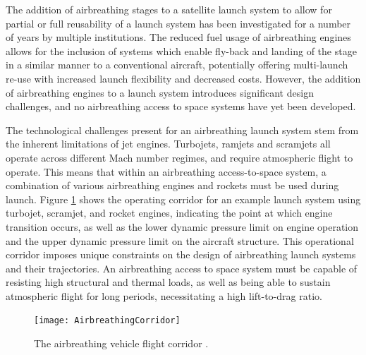   
  
  
    The addition of airbreathing stages to a satellite launch system to allow for partial or full reusability of a launch system has been investigated for a number of years by multiple institutions\cite{Powell1991,Wilhite1991,Varvill2008,Tsuchiya2005,Mehta2001,Preller2017,Trefny1999,Roche2000,Young2006,Bradford2000,Gong2014}. The reduced fuel usage of airbreathing engines allows for the inclusion of systems which enable fly-back and landing of the stage in a similar manner to a conventional aircraft, potentially offering multi-launch re-use with increased launch flexibility and decreased costs\cite{Preller2017}. However, the addition of airbreathing engines to a launch system introduces significant design challenges, and 
    no airbreathing access to space systems have yet been developed. 
    
    The technological challenges present for an airbreathing launch system stem from the inherent limitations of jet engines. Turbojets, ramjets and scramjets all operate across different Mach number regimes, and require atmospheric flight to operate\cite{Smart2009}. 
    This means that within an airbreathing access-to-space system, a combination of various airbreathing engines and rockets must be used during launch.
    Figure \ref{fig:AirbreathingCorridor} shows the operating corridor for an example launch system using turbojet, scramjet, and rocket engines, indicating the point at which engine transition occurs, as well as the lower dynamic pressure limit on engine operation and the upper dynamic pressure limit on the aircraft structure.
    This operational corridor imposes unique constraints on the design of airbreathing launch systems and their trajectories. An airbreathing access to space system must be capable of resisting high structural and thermal loads, as well as being able to sustain atmospheric flight for long periods, necessitating a high lift-to-drag ratio. 
    \begin{figure}[ht]
    	\centering
    	\texttt{[image: AirbreathingCorridor]}
    	\caption{The airbreathing vehicle flight corridor \cite{Smart2010}.}
    	\label{fig:AirbreathingCorridor}
    \end{figure}
    

    
    
